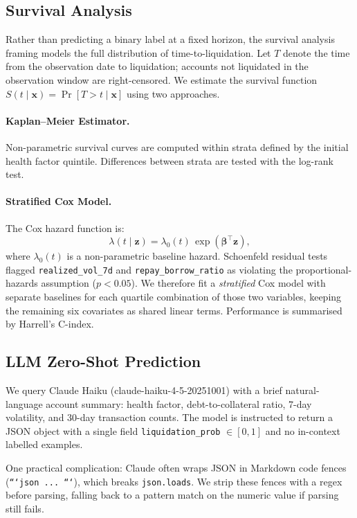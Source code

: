 \documentclass[12pt,a4paper]{article}
\newcommand{\bm}[1]{\boldsymbol{#1}}
\begin{document}
\subsection{Survival Analysis}

Rather than predicting a binary label at a fixed horizon, the survival
analysis framing models the full distribution of time-to-liquidation.  Let
$T$ denote the time from the observation date to liquidation; accounts not
liquidated in the observation window are right-censored.  We estimate the
survival function $S(t \mid \bm{x}) = \Pr[T > t \mid \bm{x}]$ using two
approaches.

\paragraph{Kaplan--Meier Estimator.}
Non-parametric survival curves \citep{kaplan1958nonparametric} are computed
within strata defined by the initial health factor quintile.  Differences
between strata are tested with the log-rank test.

\paragraph{Stratified Cox Model.}
The Cox hazard function is:
\[
    \lambda(t \mid \bm{z}) = \lambda_0(t)\,\exp(\bm{\beta}^\top \bm{z}),
\]
where $\lambda_0(t)$ is a non-parametric baseline hazard.
Schoenfeld residual tests flagged \texttt{realized\_vol\_7d} and
\texttt{repay\_borrow\_ratio} as violating the proportional-hazards assumption
($p < 0.05$).  We therefore fit a \emph{stratified} Cox model
\citep{klein2003survival} with separate baselines for each quartile
combination of those two variables, keeping the remaining six covariates as
shared linear terms.  Performance is summarised by Harrell's C-index.

\subsection{LLM Zero-Shot Prediction}

We query Claude Haiku (claude-haiku-4-5-20251001) with a brief natural-language
account summary: health factor, debt-to-collateral ratio, 7-day volatility,
and 30-day transaction counts.  The model is instructed to return a JSON
object with a single field \texttt{liquidation\_prob} $\in [0,1]$ and no
in-context labelled examples.

One practical complication: Claude often wraps JSON in Markdown code fences
(\texttt{```json\,...\,```}), which breaks \texttt{json.loads}.  We strip
these fences with a regex before parsing, falling back to a pattern match on
the numeric value if parsing still fails.
\end{document}
